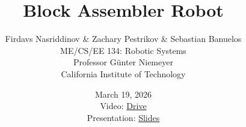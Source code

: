 \documentclass[12pt, titlepage, floatsintext]{article} %
\begin{document}
\title{Block Assembler Robot}
\author{
    Firdavs Nasriddinov \& Zachary Pestrikov \& Sebastian Banuelos\\
    ME/CS/EE 134: Robotic Systems \\
    Professor Günter Niemeyer \\
    California Institute of Technology
}
\date{
    March 19, 2026 \\[1em]
    Video: \href{https://drive.google.com/file/d/1Z5a8N6V8IHZS3Czf7M2rwoayD5a_sxi2/view?usp=sharing}{Drive} \\
    Presentation: \href{https://docs.google.com/presentation/d/1z6xrhs0PZiR2KbXnW-9BohGcE1yS3LkcOwbhKHGI4iA/edit?usp=sharing}{Slides}
}
\maketitle










\end{document}
